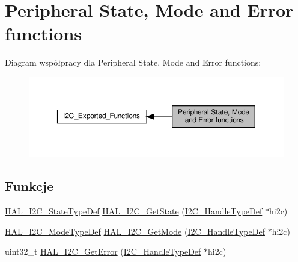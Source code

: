 \hypertarget{group___i2_c___exported___functions___group3}{}\section{Peripheral State, Mode and Error functions}
\label{group___i2_c___exported___functions___group3}
Diagram współpracy dla Peripheral State, Mode and Error functions\+:\nopagebreak
\begin{figure}[H]
\begin{center}
\leavevmode
\includegraphics[width=350pt]{group___i2_c___exported___functions___group3}
\end{center}
\end{figure}
\subsection*{Funkcje}
\begin{DoxyCompactItemize}
\item 
\hyperlink{group___h_a_l__state__structure__definition_gaef355af8eab251ae2a19ee164ad81c37}{H\+A\+L\+\_\+\+I2\+C\+\_\+\+State\+Type\+Def} \hyperlink{group___i2_c___exported___functions___group3_gad63373b093502b83d5f9bd5e292385f0}{H\+A\+L\+\_\+\+I2\+C\+\_\+\+Get\+State} (\hyperlink{group___i2_c__handle___structure__definition_ga68e9f45c2fd2161fb827ccdeabb55ea5}{I2\+C\+\_\+\+Handle\+Type\+Def} $\ast$hi2c)
\item 
\hyperlink{group___h_a_l__mode__structure__definition_gabcbb7b844f2ffd63c4e530c117882062}{H\+A\+L\+\_\+\+I2\+C\+\_\+\+Mode\+Type\+Def} \hyperlink{group___i2_c___exported___functions___group3_ga12d8407ccfb92f50caa5189b05a13351}{H\+A\+L\+\_\+\+I2\+C\+\_\+\+Get\+Mode} (\hyperlink{group___i2_c__handle___structure__definition_ga68e9f45c2fd2161fb827ccdeabb55ea5}{I2\+C\+\_\+\+Handle\+Type\+Def} $\ast$hi2c)
\item 
uint32\+\_\+t \hyperlink{group___i2_c___exported___functions___group3_ga5db5fcfa0c3fd3e45e176d000738f7bc}{H\+A\+L\+\_\+\+I2\+C\+\_\+\+Get\+Error} (\hyperlink{group___i2_c__handle___structure__definition_ga68e9f45c2fd2161fb827ccdeabb55ea5}{I2\+C\+\_\+\+Handle\+Type\+Def} $\ast$hi2c)
\end{DoxyCompactItemize}


